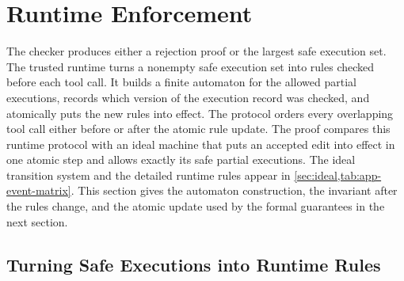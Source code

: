\section{Runtime Enforcement}
\label{sec:enforcement}

The checker produces either a rejection proof or the largest safe execution set.
The trusted runtime turns a nonempty safe execution set into rules checked before each tool call.
It builds a finite automaton for the allowed partial executions, records which version of the execution record was checked, and atomically puts the new rules into effect.
The protocol orders every overlapping tool call either before or after the atomic rule update.
The proof compares this runtime protocol with an ideal machine that puts an accepted edit into effect in one atomic step and allows exactly its safe partial executions.
The ideal transition system and the detailed runtime rules appear in \cref{sec:ideal,tab:app-event-matrix}.
This section gives the automaton construction, the invariant after the rules change, and the atomic update used by the formal guarantees in the next section.

\subsection{Turning Safe Executions into Runtime Rules}

